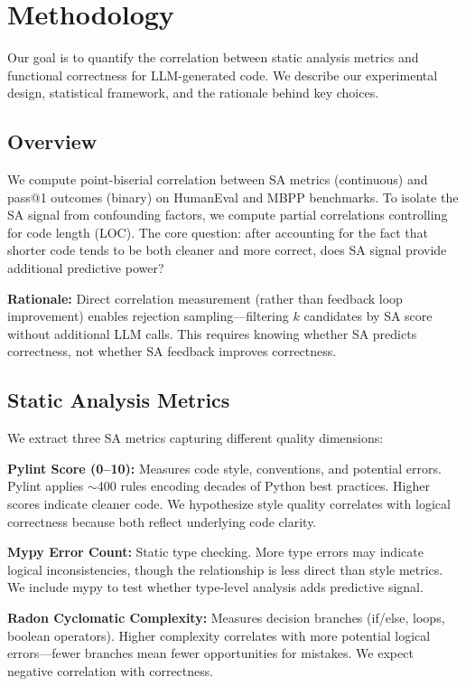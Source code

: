 \section{Methodology}
\label{sec:methodology}

Our goal is to quantify the correlation between static analysis metrics and functional correctness for LLM-generated code. We describe our experimental design, statistical framework, and the rationale behind key choices.

\subsection{Overview}

We compute point-biserial correlation between SA metrics (continuous) and pass@1 outcomes (binary) on HumanEval and MBPP benchmarks. To isolate the SA signal from confounding factors, we compute partial correlations controlling for code length (LOC). The core question: after accounting for the fact that shorter code tends to be both cleaner and more correct, does SA signal provide additional predictive power?

\textbf{Rationale:} Direct correlation measurement (rather than feedback loop improvement) enables rejection sampling---filtering $k$ candidates by SA score without additional LLM calls. This requires knowing whether SA predicts correctness, not whether SA feedback improves correctness.

\subsection{Static Analysis Metrics}

We extract three SA metrics capturing different quality dimensions:

\textbf{Pylint Score (0--10):} Measures code style, conventions, and potential errors. Pylint applies $\sim$400 rules encoding decades of Python best practices. Higher scores indicate cleaner code. We hypothesize style quality correlates with logical correctness because both reflect underlying code clarity.

\textbf{Mypy Error Count:} Static type checking. More type errors may indicate logical inconsistencies, though the relationship is less direct than style metrics. We include mypy to test whether type-level analysis adds predictive signal.

\textbf{Radon Cyclomatic Complexity:} Measures decision branches (if/else, loops, boolean operators). Higher complexity correlates with more potential logical errors---fewer branches mean fewer opportunities for mistakes. We expect negative correlation with correctness.

